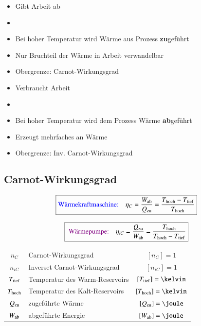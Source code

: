 \begin{minipage}[t]{0.48\columnwidth}

	\smallskip

	\begin{itemize}
		\item Gibt Arbeit ab
		\item {}
		\item Bei hoher Temperatur wird Wärme aus Prozess \textbf{zu}geführt
		\item Nur Bruchteil der Wärme in Arbeit verwandelbar
		\item Obergrenze: Carnot-Wirkungsgrad
	\end{itemize}
\end{minipage}
\hfill
\begin{minipage}[t]{0.48\columnwidth}

	\smallskip

	\begin{itemize}
		\item Verbraucht Arbeit
		\item {}
		\item Bei hoher Temperatur wird dem Prozess Wärme \textbf{ab}geführt
		\item Erzeugt mehrfaches an Wärme
		\item Obergrenze: Inv. Carnot-Wirkungsgrad
	\end{itemize}
\end{minipage}

\subsection{Carnot-Wirkungsgrad}

\vspace{-0.2cm}

$$ \boxed{\text{{\color{blue}Wärmekraftmaschine:}}  \quad \eta_C = \frac{W_{\rm ab}}{Q_{\rm zu}} = \frac{T_{\rm hoch} - T_{\rm tief}}{T_{\rm hoch}} } $$

$$ \boxed{\text{ {\color{violet}Wärmepumpe:}} \quad  \eta_{iC} = \frac{Q_{\rm zu}}{W_{\rm ab}} = \frac{T_{\rm hoch}}{T_{\rm hoch} - T_{\rm tief}} } $$


\begin{tabular}{c l c}
	$n_C$ 			& Carnot-Wirkungsgrad 				& $[n_C] = 1$ 					\\
	$n_{iC}$ 		& Inverset Carnot-Wirkungsgrad 		& $[n_{iC}] = 1$ 				\\
	$T_{\rm tief}$ 	& Temperatur des Warm-Reservoirs 	& $[T_{\rm tief}] = \kelvin$	\\
	$T_{\rm hoch}$ 	& Temperatur des Kalt-Reservoirs 	& $[T_{\rm hoch}] = \kelvin$ 	\\
	$Q_{\rm zu}$ 	& zugeführte Wärme 					& $[Q_{\rm zu}] = \joule$ 		\\ 
	$W_{\rm ab}$ 	& abgeführte Energie 				& $[W_{\rm ab}] = \joule$
\end{tabular}

